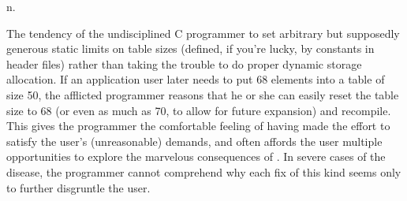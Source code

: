  n.

The tendency of the undisciplined C programmer to set arbitrary but supposedly
generous static limits on table sizes (defined, if you're lucky, by constants in
header files) rather than taking the trouble to do proper dynamic storage
allocation. If an application user later needs to put 68 elements into a table
of size 50, the afflicted programmer reasons that he or she can easily reset the
table size to 68 (or even as much as 70, to allow for future expansion) and
recompile. This gives the programmer the comfortable feeling of having made the
effort to satisfy the user's (unreasonable) demands, and often affords the user
multiple opportunities to explore the marvelous consequences of
. In severe cases of the disease, the programmer
cannot comprehend why each fix of this kind seems only to further disgruntle the
user.

